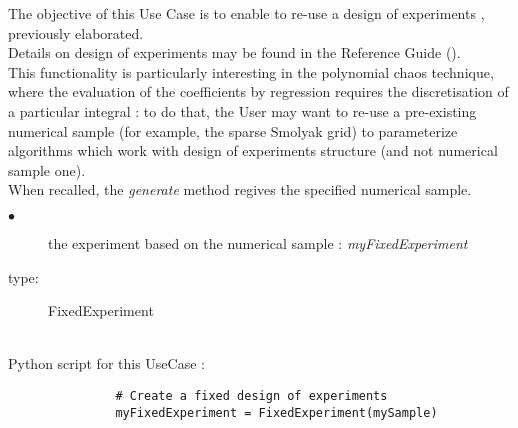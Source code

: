 \renewcommand{\filename}{docUC_MinMax_SpecifiedExperimentPlane.tex}
\renewcommand{\filetitle}{UC : Re-use of a specified numerical sample as design of experiments }

\HeaderIIILevel

\label{fixedExpPlane}



The objective of this Use Case is to enable to re-use a design of experiments , previously elaborated.\\

Details on design of experiments   may be found in the Reference Guide ().\\


This functionality is particularly interesting in the polynomial chaos technique, where the evaluation of the coefficients by regression requires the discretisation of a particular integral : to do that, the User may want to re-use a pre-existing numerical sample (for example, the sparse Smolyak grid) to parameterize algorithms which work with design of experiments  structure (and not numerical sample one).\\

When recalled, the {\itshape generate} method regives the specified numerical sample.\\


             {
               \begin{description}
               \item[$\bullet$] the experiment based on the numerical sample : {\itshape myFixedExperiment}
               \item[type:] FixedExperiment
               \end{description}
             }

             \textspace\\
             Python script for this UseCase :

             \begin{lstlisting}
               # Create a fixed design of experiments
               myFixedExperiment = FixedExperiment(mySample)
             \end{lstlisting}
